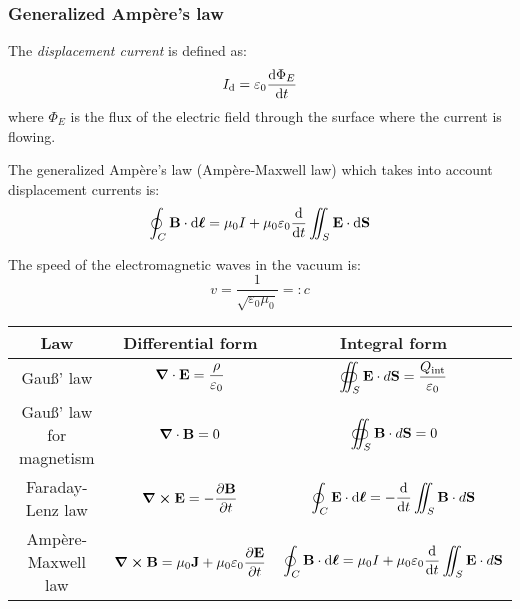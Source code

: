 \documentclass[../../../main.tex]{subfiles}
\begin{document}
\begin{multicols}{2}
  \subsubsection{Generalized Ampère's law}
  \begin{definition}
    The \emph{displacement current} is defined as: $$I_\text{d}=\varepsilon_0\dv{\Phi_E}{t}$$ where $\Phi_E$ is the flux of the electric field through the surface where the current is flowing.
  \end{definition}
  \begin{law}
    The generalized Ampère's law (Ampère-Maxwell law) which takes into account displacement currents is: $$\oint_C\boldsymbol{\mathrm{B}}\cdot \dd{\boldsymbol{\mathrm{\ell}}}=\mu_0 I+\mu_0\varepsilon_0\dv{}{t}\iint_S\boldsymbol{\mathrm{E}}\cdot \dd{\boldsymbol{\mathrm{S}}}$$
  \end{law}
  \begin{definition}
    The speed of the electromagnetic waves in the vacuum is: $$v=\frac{1}{\sqrt{\varepsilon_0\mu_0}}=:c$$
  \end{definition}
\end{multicols}
\begin{table}[ht]
  \centering
  \renewcommand{\arraystretch}{2.5}
  \begin{tabular}{|c|c|c|}
    \hline
    \bfseries Law             & \bfseries Differential form                                                                                & \bfseries Integral form                                                                                        \\
    \hline
    Gau\ss' law               & $\displaystyle \boldsymbol{\mathrm{\grad}}\cdot\boldsymbol{\mathrm{E}}=\frac{\rho}{\varepsilon_0}$                                           & $\displaystyle \oiint_S\boldsymbol{\mathrm{E}}\cdot d\boldsymbol{\mathrm{S}}=\frac{Q_{\text{int}}}{\varepsilon_0}$                               \\
    \hline
    Gau\ss' law for magnetism & $\displaystyle \boldsymbol{\mathrm{\grad}}\cdot\boldsymbol{\mathrm{B}}=0$                                                                    & $\displaystyle \oiint_S\boldsymbol{\mathrm{B}}\cdot d\boldsymbol{\mathrm{S}}=0$                                                                  \\
    \hline
    Faraday-Lenz law          & $\displaystyle \vf{\grad}\crossprod\vf{E}=-\frac{\partial\vf{B}}{\partial t}$                              & $\displaystyle \oint_C\boldsymbol{\mathrm{E}}\cdot \dd{\boldsymbol{\mathrm{\ell}}}=-\dv{}{t}\iint_S\boldsymbol{\mathrm{B}}\cdot d\boldsymbol{\mathrm{S}}$                          \\
    \hline
    Ampère-Maxwell law        & $\displaystyle \vf{\grad}\crossprod\vf{B}=\mu_0\vf{J}+\mu_0\varepsilon_0\frac{\partial\vf{E}}{\partial t}$ & $\displaystyle \oint_C\boldsymbol{\mathrm{B}}\cdot \dd{\boldsymbol{\mathrm{\ell}}}=\mu_0 I+\mu_0\varepsilon_0\dv{}{t}\iint_S\boldsymbol{\mathrm{E}}\cdot d\boldsymbol{\mathrm{S}}$ \\
    \hline
  \end{tabular}
\end{table}
\end{document}
